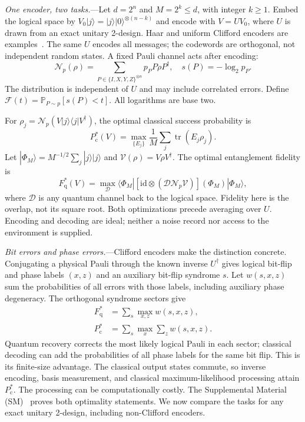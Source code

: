 \documentclass[aps,prl,reprint,superscriptaddress,amsmath,amssymb]{revtex4-2}
\newcommand{\Prb}{\mathbb P}
\newcommand{\N}{\mathcal N}
\newcommand{\tr}{\operatorname{tr}}
\newcommand{\Pc}{P_{\mathrm c}^{*}}
\newcommand{\Fq}{F_{\mathrm q}^{*}}
\newcommand{\Fs}{\mathcal F}
\begin{document}
\emph{One encoder, two tasks.}---Let $d=2^n$ and $M=2^k\le d$, with integer
$k\ge1$. Embed the logical space by
$V_0|j\rangle=|j\rangle|0\rangle^{\otimes(n-k)}$ and encode with $V=UV_0$,
where $U$ is drawn from an exact unitary 2-design. Haar and uniform Clifford
encoders are examples~\cite{Dankert}. The same $U$ encodes all messages; the
codewords are orthogonal, not independent random states. A fixed Pauli channel
acts after encoding:
\begin{equation}
\N_p(\rho)=\sum_{P\in\{I,X,Y,Z\}^{\otimes n}}p_PP\rho P^\dagger,
\quad s(P)=-\log_2p_P.
\label{eq:noise}
\end{equation}
The distribution is independent of $U$ and may include correlated errors.
Define $\Fs(t)=\Prb_{P\sim p}[s(P)<t]$. All logarithms are base two.

For $\rho_j=\N_p(V|j\rangle\langle j|V^\dagger)$, the optimal classical
success probability is
\begin{equation}
\Pc(V)=\max_{\{E_j\}}\frac1M\sum_j\tr(E_j\rho_j).
\label{eq:classical}
\end{equation}
Let $|\Phi_M\rangle=M^{-1/2}\sum_j|j\rangle|j\rangle$ and
$\mathcal V(\rho)=V\rho V^\dagger$. The optimal entanglement fidelity is
\begin{equation}
\Fq(V)=\max_{\mathcal D}\langle\Phi_M|
[\mathrm{id}\otimes(\mathcal D\N_p\mathcal V)](\Phi_M)|\Phi_M\rangle,
\label{eq:quantum}
\end{equation}
where $\mathcal D$ is any quantum channel back to the logical space. Fidelity
here is the overlap, not its square root. Both optimizations precede averaging
over $U$. Encoding and decoding are ideal; neither a noise record nor access
to the environment is supplied.

\emph{Bit errors and phase errors.}---Clifford encoders make the distinction
concrete. Conjugating a physical Pauli through the known inverse $U^\dagger$
gives logical bit-flip and phase labels $(x,z)$ and an auxiliary bit-flip
syndrome $s$. Let $w(s,x,z)$ sum the probabilities of all errors with those
labels, including auxiliary phase degeneracy. The orthogonal syndrome sectors
give~\cite{StabilizerConverse}
\begin{align}
\Fq&=\sum_s\max_{x,z}w(s,x,z),\nonumber\\
\Pc&=\sum_s\max_x\sum_z w(s,x,z).
\label{eq:clifford}
\end{align}
Quantum recovery corrects the most likely logical Pauli in each sector;
classical decoding can add the probabilities of all phase labels for the
same bit flip. This is its finite-size advantage. The classical output states
commute, so inverse encoding, basis measurement, and classical
maximum-likelihood processing attain $\Pc$. The processing can be
computationally costly. The Supplemental Material (SM)~\cite{SM} proves both
optimality statements. We now compare the tasks for any exact unitary 2-design,
including non-Clifford encoders.
\end{document}
